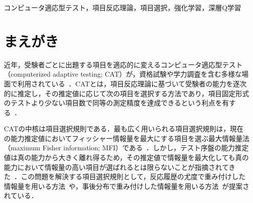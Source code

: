 \documentclass[paper]{ieicej}
\begin{document}
\begin{abstract}
コンピュータ適応型テストでは，受験者の能力推定値に応じて次に出題する項目を逐次的に選択する．近年，項目選択を逐次決定問題として定式化し，深層Q学習により選択方策を学習する方法が提案され，最大情報量法を上回る推定精度が報告されている．しかし，この方法には，Q関数の全パラメータに課される非負制約が価値関数の形を制限すること，能力推定値だけを状態とするため状態の遷移が一意に定まらないこと，及び報酬が最大情報量法の項目選択規準と一致するため推定値の不確実性を報酬に反映できないことという問題がある．本論文では，最尤推定値，テストの進行度，事後分散からなる状態と，事後精度の増分という推定値の不確実性を考慮した報酬を用い，パラメータに制約を課さない深層Q学習型の項目選択法を提案する．2パラメータロジスティックモデルに基づくシミュレーション実験により，提案手法がテスト序盤で最大情報量法を上回り，事後分布に基づく解析的な項目選択規則と同等の精度を，候補項目ごとの期待値計算を学習したQ関数で置き換えて達成すること，既存手法の劣化の決定的な要因が非負制約と学習設定であること，及びデータ生成モデルが推測を含む場合には実際の反応から学習した提案手法が解析的な項目選択規則を小さいながら一貫して上回ることを示す．
\end{abstract}
\begin{keyword}
コンピュータ適応型テスト，項目反応理論，項目選択，強化学習，深層Q学習
\end{keyword}
\maketitle

\section{まえがき}\label{sec:intro}

近年，受験者ごとに出題する項目を適応的に変えるコンピュータ適応型テスト（computerized adaptive testing; CAT）が，資格試験や学力調査を含む多様な場面で利用されている~\cite{Wainer2000}．CATとは，項目反応理論に基づいて受験者の能力を逐次的に推定し，その推定値に応じて次の項目を選択する方法であり，項目固定形式のテストより少ない項目数で同等の測定精度を達成できるという利点を有する~\cite{Lord1980,Wainer2000}．

CATの中核は項目選択規則である．最も広く用いられる項目選択規則は，現在の能力推定値においてフィッシャー情報量を最大にする項目を選ぶ最大情報量法（maximum Fisher information; MFI）である~\cite{Lord1980}．しかし，テスト序盤の能力推定値は真の能力から大きく離れ得るため，その推定値で情報量を最大化しても真の能力において情報量の高い項目が選ばれるとは限らないことが指摘されてきた~\cite{ChangYing1996}．この問題を解決する項目選択規則として，反応履歴の尤度で重み付けした情報量を用いる方法~\cite{VeerkampBerger1997}や，事後分布で重み付けした情報量を用いる方法~\cite{vanderLinden1998}が提案されている．
\end{document}
